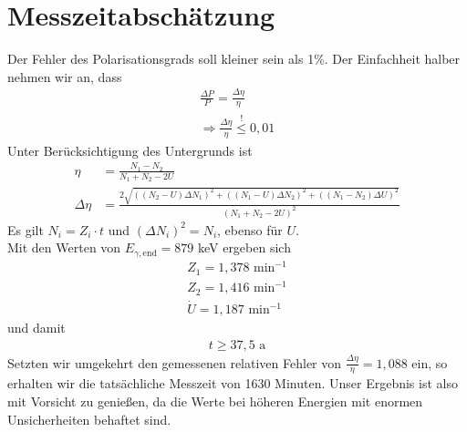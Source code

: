 \documentclass[twoside,colorback,accentcolor=tud4c,11pt]{tudreport}
\begin{document}
\section{Messzeitabschätzung}
Der Fehler des Polarisationsgrads soll kleiner sein als 1\%. Der Einfachheit halber nehmen wir an, dass 
\begin{align}
\frac{\Delta P}{P}=\frac{\Delta \eta}{\eta}\\
\Rightarrow \frac{\Delta \eta}{\eta}\stackrel{!}{\leq} 0,01
\end{align}
Unter Berücksichtigung des Untergrunds ist 
\begin{align}
\eta&=\frac{N_1-N_2}{N_1+N_2-2U}\\
\Delta\eta&=\frac{2\sqrt{((N_2-U)\Delta N_1)^2+((N_1-U)\Delta N_2)^2+((N_1-N_2)\Delta U)^2}}{(N_1+N_2-2U)^2}
\end{align}
Es gilt $ N_i=Z_i\cdot t $ und $ (\Delta N_i)^2=N_i $, ebenso für $U$.\\
Mit den Werten von $ E_{\gamma,\text{end}}=879 $ keV ergeben sich
\begin{align}
Z_1=1,378 \text{ min}^{-1}\\
Z_2=1,416 \text{ min}^{-1}\\
\dot{U}=1,187\text{ min}^{-1}
\end{align}
und damit 
\begin{align}
t\geq 37,5 \text{ a}
\end{align}
Setzten wir umgekehrt den gemessenen relativen Fehler von $ \frac{\Delta \eta}{\eta}=1,088 $ ein, so erhalten wir die tatsächliche Messzeit von 1630 Minuten. Unser Ergebnis ist also mit Vorsicht zu genießen, da die Werte bei höheren Energien mit enormen Unsicherheiten behaftet sind.
\end{document}
